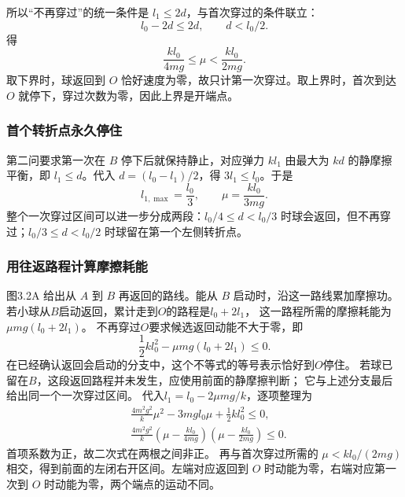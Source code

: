 \documentclass[UTF8,fontset=fandol,a4paper,11pt]{ctexart}
\begin{document}
所以“不再穿过”的统一条件是 $l_1\leq2d$，与首次穿过的条件联立：
\[
l_0-2d\leq2d,\qquad d<l_0/2.
\]
得
\[
\boxed{\frac{kl_0}{4mg}\leq\mu<\frac{kl_0}{2mg}}.
\]
取下界时，球返回到 $O$ 恰好速度为零，故只计第一次穿过。取上界时，首次到达 $O$ 就停下，穿过次数为零，因此上界是开端点。

\subsubsection*{首个转折点永久停住}
第二问要求第一次在 $B$ 停下后就保持静止，对应弹力 $kl_1$ 由最大为 $kd$ 的静摩擦平衡，即 $l_1\leq d$。代入 $d=(l_0-l_1)/2$，得 $3l_1\leq l_0$。于是
\[
\boxed{l_{1,\max}=\frac{l_0}{3}},\qquad
\boxed{\mu=\frac{kl_0}{3mg}}.
\]
整个一次穿过区间可以进一步分成两段：$l_0/4\leq d<l_0/3$ 时球会返回，但不再穿过；$l_0/3\leq d<l_0/2$ 时球留在第一个左侧转折点。
\subsubsection*{用往返路程计算摩擦耗能}
图3.2A 给出从 $A$ 到 $B$ 再返回的路线。能从 $B$ 启动时，沿这一路线累加摩擦功。
若小球从$B$启动返回，累计走到$O$的路程是$l_0+2l_1$，
这一路程所需的摩擦耗能为$\mu mg(l_0+2l_1)$。
不再穿过$O$要求候选返回动能不大于零，即
\[
\frac12kl_0^2-\mu mg(l_0+2l_1)\leq0.
\]
在已经确认返回会启动的分支中，这个不等式的等号表示恰好到$O$停住。
若球已留在$B$，这段返回路程并未发生，应使用前面的静摩擦判断；
它与上述分支最后给出同一个一次穿过区间。
代入$l_1=l_0-2\mu mg/k$，逐项整理为
\[
\begin{aligned}
&\frac{4m^2g^2}{k}\mu^2-3mgl_0\mu+\frac12kl_0^2\leq0,\\
&\frac{4m^2g^2}{k}
\left(\mu-\frac{kl_0}{4mg}\right)
\left(\mu-\frac{kl_0}{2mg}\right)\leq0.
\end{aligned}
\]
首项系数为正，故二次式在两根之间非正。
再与首次穿过所需的 $\mu<kl_0/(2mg)$ 相交，得到前面的左闭右开区间。左端对应返回到 $O$ 时动能为零，右端对应第一次到 $O$ 时动能为零，两个端点的运动不同。
\end{document}

